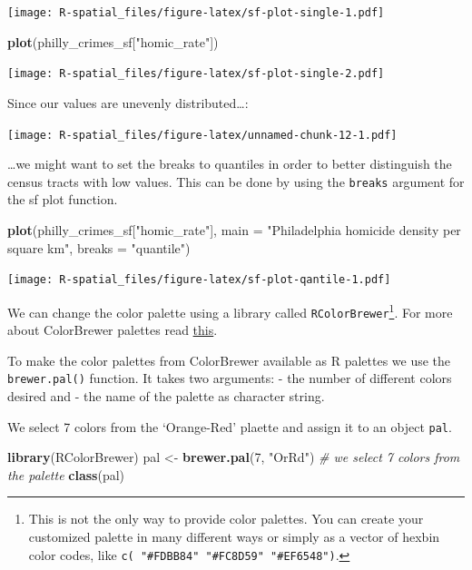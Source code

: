 \documentclass[]{book}
\newenvironment{Shaded}{\begin{snugshade}}{\end{snugshade}}
\newcommand{\KeywordTok}[1]{\textcolor[rgb]{0.13,0.29,0.53}{\textbf{#1}}}
\newcommand{\DataTypeTok}[1]{\textcolor[rgb]{0.13,0.29,0.53}{#1}}
\newcommand{\DecValTok}[1]{\textcolor[rgb]{0.00,0.00,0.81}{#1}}
\newcommand{\StringTok}[1]{\textcolor[rgb]{0.31,0.60,0.02}{#1}}
\newcommand{\CommentTok}[1]{\textcolor[rgb]{0.56,0.35,0.01}{\textit{#1}}}
\newcommand{\NormalTok}[1]{#1}
\let\rmarkdownfootnote\footnote%
\def\footnote{\protect\rmarkdownfootnote}
\begin{document}
\texttt{[image: R-spatial\_files/figure-latex/sf-plot-single-1.pdf]}

\begin{Shaded}
\begin{Highlighting}[]
\KeywordTok{plot}\NormalTok{(philly_crimes_sf[}\StringTok{"homic_rate"}\NormalTok{])}
\end{Highlighting}
\end{Shaded}

\texttt{[image: R-spatial\_files/figure-latex/sf-plot-single-2.pdf]}

Since our values are unevenly distributed\ldots{}:

\texttt{[image: R-spatial\_files/figure-latex/unnamed-chunk-12-1.pdf]}

\ldots{}we might want to set the breaks to quantiles in order to better
distinguish the census tracts with low values. This can be done by using
the \texttt{breaks} argument for the sf plot function.

\begin{Shaded}
\begin{Highlighting}[]
\KeywordTok{plot}\NormalTok{(philly_crimes_sf[}\StringTok{"homic_rate"}\NormalTok{], }
     \DataTypeTok{main =} \StringTok{"Philadelphia homicide density per square km"}\NormalTok{, }
     \DataTypeTok{breaks =} \StringTok{"quantile"}\NormalTok{)}
\end{Highlighting}
\end{Shaded}

\texttt{[image: R-spatial\_files/figure-latex/sf-plot-qantile-1.pdf]}

We can change the color palette using a library called
\texttt{RColorBrewer}\footnote{This is not the only way to provide color
  palettes. You can create your customized palette in many different
  ways or simply as a vector of hexbin color codes, like
  \texttt{c(\ "\#FDBB84"\ "\#FC8D59"\ "\#EF6548")}.}. For more about
ColorBrewer palettes read \href{http://colorbrewer2.org}{this}.

To make the color palettes from ColorBrewer available as R palettes we
use the \texttt{brewer.pal()} function. It takes two arguments: - the
number of different colors desired and - the name of the palette as
character string.

We select 7 colors from the `Orange-Red' plaette and assign it to an
object \texttt{pal}.

\begin{Shaded}
\begin{Highlighting}[]
\KeywordTok{library}\NormalTok{(RColorBrewer)}
\NormalTok{pal <-}\StringTok{ }\KeywordTok{brewer.pal}\NormalTok{(}\DecValTok{7}\NormalTok{, }\StringTok{"OrRd"}\NormalTok{) }\CommentTok{# we select 7 colors from the palette}
\KeywordTok{class}\NormalTok{(pal)}
\end{Highlighting}
\end{Shaded}
\end{document}
